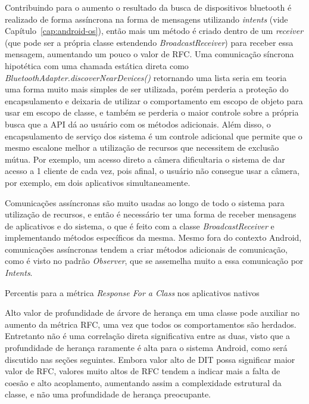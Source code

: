 Contribuindo para o aumento o resultado da busca de dispositivos bluetooth é realizado de forma assíncrona na forma de mensagens utilizando \textit{intents} (vide Capítulo~\ref{cap:android-os}), então mais um método é criado dentro de um \textit{receiver} (que pode ser a própria classe estendendo \textit{BroadcastReceiver}) para receber essa mensagem, aumentando um pouco o valor de RFC. Uma comunicação síncrona hipotética com uma chamada estática direta como \textit{BluetoothAdapter.discoverNearDevices()} retornando uma lista seria em teoria uma forma muito mais simples de ser utilizada, porém perderia a proteção do encapsulamento e deixaria de utilizar o comportamento em escopo de objeto para usar em escopo de classe, e também se perderia o maior controle sobre a própria busca que a API dá ao usuário com os métodos adicionais. Além disso, o encapsulamento de serviço dos sistema é um controle adicional que permite que o mesmo escalone melhor a utilização de recursos que necessitem de exclusão mútua. Por exemplo, um acesso direto a câmera dificultaria o sistema de dar acesso a 1 cliente de cada vez, pois afinal, o usuário não consegue usar a câmera, por exemplo, em dois aplicativos simultaneamente.

Comunicações assíncronas são muito usadas ao longo de todo o sistema para utilização de recursos, e então é necessário ter uma forma de receber mensagens de aplicativos e do sistema, o que é feito com a classe \textit{BroadcastReceiver} e implementando métodos específicos da mesma. Mesmo fora do contexto Android, comunicações assíncronas tendem a criar métodos adicionais de comunicação, como é visto no padrão \textit{Observer}, que se assemelha muito a essa comunicação por \textit{Intents}.

\begin{table}[!htb]

\caption{Percentis para a métrica \textit{Response For a Class} nos aplicativos nativos}
\label{tab:rfc_apps}
\end{table}

Alto valor de profundidade de árvore de herança em uma classe pode auxiliar no aumento da métrica RFC, uma vez que todos os comportamentos são herdados. Entretanto não é uma correlação direta significativa entre as duas, visto que a profundidade de herança raramente é alta para o sistema Android, como será discutido nas seções seguintes. Embora valor alto de DIT possa significar maior valor de RFC, valores muito altos de RFC tendem a indicar mais a falta de coesão e alto acoplamento, aumentando assim a complexidade estrutural da classe, e não uma profundidade de herança preocupante.

